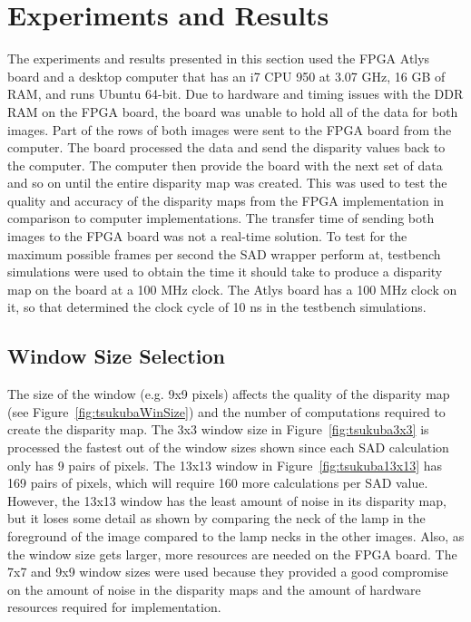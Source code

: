 \newcolumntype{+}{>{\global\let\currentrowstyle\relax}}
\newcolumntype{^}{>{\currentrowstyle}}
\newcommand{\rowstyle}[1]{\gdef\currentrowstyle{#1}%
#1\ignorespaces
}

\chapter{Experiments and Results}
\label{sec:exp}

The experiments and results presented in this section used the FPGA Atlys board and a desktop computer that has an i7 CPU 950 at 3.07 GHz, 16 GB of RAM, and runs Ubuntu 64-bit. Due to hardware and timing issues with the DDR RAM on the FPGA board, the board was unable to hold all of the data for both images. Part of the rows of both images were sent to the FPGA board from the computer. The board processed the data and send the disparity values back to the computer. The computer then provide the board with the next set of data and so on until the entire disparity map was created. This was used to test the quality and accuracy of the disparity maps from the FPGA implementation in comparison to computer implementations. The transfer time of sending both images to the FPGA board was not a real-time solution. To test for the maximum possible frames per second the SAD wrapper perform at, testbench simulations were used to obtain the time it should take to produce a disparity map on the board at a 100 MHz clock. The Atlys board has a 100 MHz clock on it, so that determined the clock cycle of 10 ns in the testbench simulations.

\section{Window Size Selection}
\label{sec:windowSize}

The size of the window (e.g. 9x9 pixels) affects the quality of the disparity map (see Figure~\ref{fig:tsukubaWinSize}) and the number of computations required to create the disparity map. The 3x3 window size in Figure~\ref{fig:tsukuba3x3} is processed the fastest out of the window sizes shown since each SAD calculation only has 9 pairs of pixels. The 13x13 window in Figure~\ref{fig:tsukuba13x13} has 169 pairs of pixels, which will require 160 more calculations per SAD value. However, the 13x13 window has the least amount of noise in its disparity map, but it loses some detail as shown by comparing the neck of the lamp in the foreground of the image compared to the lamp necks in the other images. Also, as the window size gets larger, more resources are needed on the FPGA board. The 7x7 and 9x9 window sizes were used because they provided a good compromise on the amount of noise in the disparity maps and the amount of hardware resources required for implementation. 

